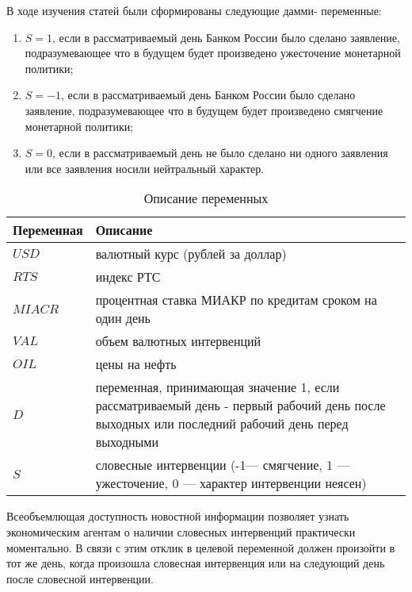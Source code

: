 В ходе изучения статей были сформированы следующие дамми-
переменные:

\begin{enumerate}
\item[] $S=1$, если в рассматриваемый день Банком России было сделано заявление, подразумевающее что в будущем будет произведено ужесточение монетарной политики;

\item[] $S=-1$, если в рассматриваемый день Банком России было сделано заявление, подразумевающее что в будущем будет произведено смягчение монетарной политики;

\item[] $S=0$, если в рассматриваемый день не было сделано ни одного заявления или все заявления носили нейтральный характер.
\end{enumerate}

\begin{table}[h]
	\begin{center}
		\caption{Описание переменных}\label{varieble}
		\begin{tabular}{|m{3cm}|m{8cm}|}
  		\hline
  		Переменная & Описание \\ \hline
    	$USD$ & валютный курс (рублей за доллар)  \\ \hline
  		$RTS$ & индекс РТС \\ \hline
  		$MIACR$ & процентная ставка МИАКР по кредитам сроком на один день \\ \hline
  		$VAL$ & объем валютных интервенций\\ \hline
  		$OIL$ & цены на нефть \\ \hline
  		$D$ & переменная, принимающая значение 1, если рассматриваемый день - первый рабочий день после выходных или последний рабочий день перед выходными \\ \hline
  		$S$ & словесные интервенции (-1--- смягчение, 1 --- ужесточение, 0 --- характер интервенции неясен) \\ \hline
		\end{tabular}
	\end{center}
\end{table}

Всеобъемлющая доступность новостной информации позволяет узнать экономическим агентам о наличии словесных интервенций практически моментально. В связи с этим отклик в целевой переменной должен произойти в тот же день, когда произошла словесная интервенция или на следующий день после словесной интервенции.

